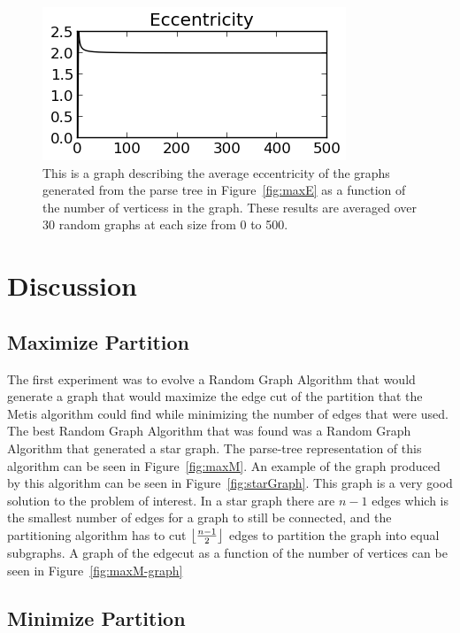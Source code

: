 \documentclass{article}
\DeclarePairedDelimiter\floor{\lfloor}{\rfloor}
\begin{document}
\begin{figure}
\begin{centering}
  \includegraphics[scale=1]{minE2-Eccentricity.png}
  \caption{This is a graph describing the average eccentricity of the graphs generated from the parse tree in Figure~\ref{fig:maxE} as a function of the number of verticess in the graph. 
    These results are averaged over 30 random graphs at each size from 0 to 500.}
  \label{fig:minE-graph}
\end{centering}
\end{figure}

\section{Discussion}

\subsection{Maximize Partition}
The first experiment was to evolve a Random Graph Algorithm that would generate a graph that would maximize the edge cut of the partition
that the Metis algorithm could find while minimizing the number of edges that were used. The best Random Graph Algorithm that was found
was a Random Graph Algorithm that generated a star graph. The parse-tree representation of this algorithm can be seen in Figure~\ref{fig:maxM}.
An example of the graph produced by this algorithm can be seen in Figure~\ref{fig:starGraph}. This graph is a very good solution to the 
problem of interest. In a star graph there are $n-1$ edges which is the smallest number of edges for a graph to still be connected, and the
partitioning algorithm has to cut $\floor*{\frac{n-1}{2}}$ edges to partition the graph into equal subgraphs. A graph of the edgecut as a function
of the number of vertices can be seen in Figure~\ref{fig:maxM-graph}

\subsection{Minimize Partition}
\end{document}
